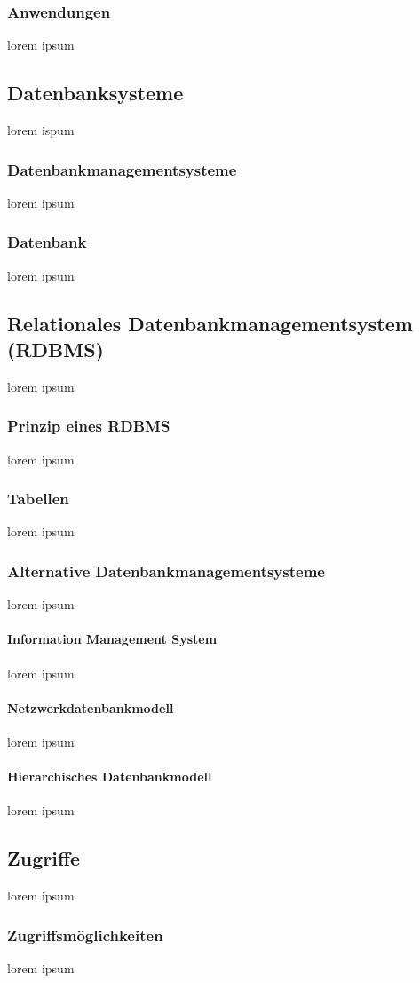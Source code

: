 \documentclass[12pt,a4paper]{report}
\begin{document}
\subsubsection{Anwendungen}
lorem ipsum
\subsection{Datenbanksysteme}
lorem ispum
\subsubsection{Datenbankmanagementsysteme}
lorem ipsum
\subsubsection{Datenbank}
lorem ipsum
\subsection{Relationales Datenbankmanagementsystem (RDBMS)}
lorem ipsum
\subsubsection{Prinzip eines RDBMS}
lorem ipsum
\subsubsection{Tabellen}
lorem ipsum
\subsubsection{Alternative Datenbankmanagementsysteme}
lorem ipsum
\paragraph{Information Management System}
lorem ipsum
\paragraph{Netzwerkdatenbankmodell}
lorem ipsum
\paragraph{Hierarchisches Datenbankmodell}
lorem ipsum
\subsection{Zugriffe}
lorem ipsum
\subsubsection{Zugriffsmöglichkeiten}
lorem ipsum
\end{document}

